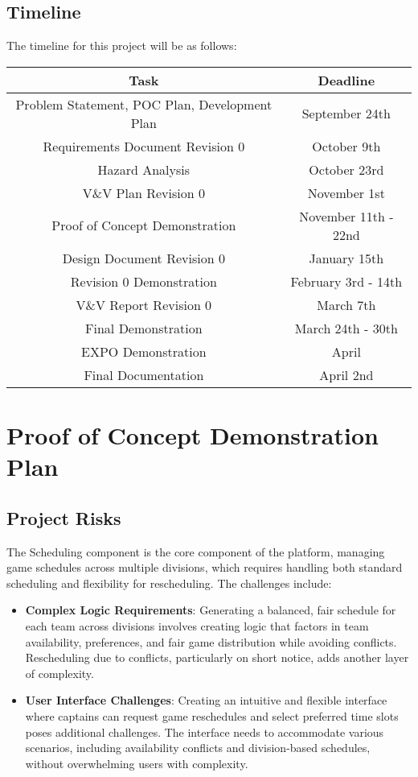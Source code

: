 \documentclass{article}
\begin{document}
\subsection{Timeline}
The timeline for this project will be as follows:

\begin{center}
    \begin{tabular}{ |c|c| }
        \hline
        \textbf{Task}  & \textbf{Deadline} \\
        \hline
        Problem Statement, POC Plan, Development Plan & September 24th \\
        Requirements Document Revision 0 & October 9th \\
        Hazard Analysis & October 23rd \\
        V\&V Plan Revision 0 & November 1st \\
        Proof of Concept Demonstration & November 11th - 22nd \\
        Design Document Revision 0 & January 15th \\
        Revision 0 Demonstration & February 3rd - 14th \\
        V\&V Report Revision 0 & March 7th \\
        Final Demonstration & March 24th - 30th \\
        EXPO Demonstration & April \\
        Final Documentation & April 2nd \\
        \hline
    \end{tabular}
\end{center}

\section{Proof of Concept Demonstration Plan}

\subsection{Project Risks}

The Scheduling component is the core component of the platform, managing game schedules across multiple divisions, which requires handling both standard scheduling and flexibility for rescheduling. The challenges include:

\begin{itemize}
	\item \textbf{Complex Logic Requirements}: Generating a balanced, fair schedule for each team across divisions involves creating logic that factors in team availability, preferences, and fair game distribution while avoiding conflicts. Rescheduling due to conflicts, particularly on short notice, adds another layer of complexity.
	\item \textbf{User Interface Challenges}: Creating an intuitive and flexible interface where captains can request game reschedules and select preferred time slots poses additional challenges. The interface needs to accommodate various scenarios, including availability conflicts and division-based schedules, without overwhelming users with complexity.
\end{itemize}
\end{document}
